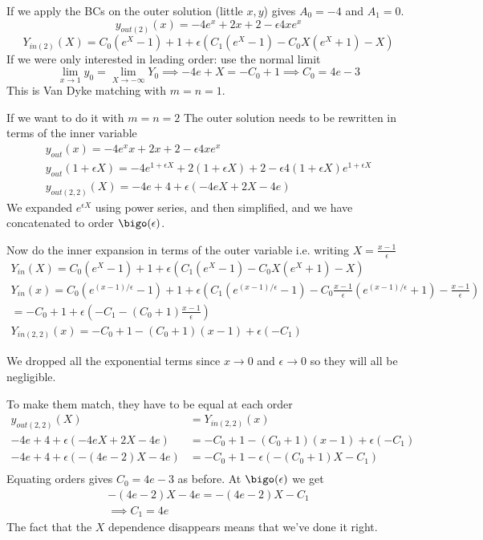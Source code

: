 \documentclass{/home/janmebows/Documents/LatexTemplates/myassignment}
\begin{document}
If we apply the BCs on the outer solution (little $x,y$) gives $A_0 = -4$ and $A_1 =0$. 
\[y_{out(2)}(x) = -4e^x + 2x + 2 - \epsilon 4xe^x\]
\[Y_{in(2)}(X) = C_0(e^X -1) + 1 + \epsilon(C_1(e^X -1) - C_0X(e^X + 1) - X)\]
If we were only interested in leading order: use the normal limit 
\[\lim_{x\to 1} y_0 = \lim_{X\to-\infty} Y_0 \implies -4e +X = -C_0 +1 \implies C_0 = 4e-3\]
This is Van Dyke matching with $m=n=1$.

If we want to do it with $m=n=2$ The outer solution needs to be rewritten in terms of the inner variable
\begin{align*}
    y_{out}(x) =-4e^xx + 2x + 2 -\epsilon 4xe^x \\
    y_{out}(1+\epsilon X) = -4e^{1+\epsilon X} +2 (1+\epsilon X)+2 -\epsilon 4(1+\epsilon X) e^{1+\epsilon X}\\
    y_{out(2,2)}(X) = -4e + 4 + \epsilon(-4eX + 2X - 4e)
\end{align*}
We expanded $e^{\epsilon X}$ using power series, and then simplified, and we have concatenated to order $\bigo(\epsilon)$.


Now do the inner expansion in terms of the outer variable i.e. writing $X = \frac{x-1}{\epsilon}$
\begin{align*}
    Y_{in}(X) = C_0(e^X - 1) + 1 + \epsilon \left(C_1(e^X - 1) - C_0 X(e^X +1) -X\right)\\
    Y_{in}(x) = C_0(e^{(x-1)/\epsilon} -1 )+1 + \epsilon\left(C_1 (e^{(x-1)/\epsilon} -1) - C_0\frac{x-1}{\epsilon}(e^{(x-1)/\epsilon}+1 ) - \frac{x-1}{\epsilon}\right)\\
    = -C_0 + 1 + \epsilon\left(-C_1 - (C_0 +1) \frac{x-1}{\epsilon}\right)\\
    Y_{in(2,2)}(x) = -C_0 + 1 - (C_0 + 1) (x-1) + \epsilon(-C_1)
\end{align*}

We dropped all the exponential terms since $x\to 0$ and $\epsilon\to 0$ so they will all be negligible.

To make them match, they have to be equal at each order
\begin{align*}
    y_{out(2,2)}(X) &= Y_{in(2,2)}(x)\\
    -4e + 4 + \epsilon(-4eX + 2X - 4e) &= -C_0 + 1 - (C_0 + 1) (x-1) + \epsilon(-C_1)\\
    -4e + 4 + \epsilon(-(4e- 2)X - 4e) &= -C_0 + 1 - \epsilon(-(C_0 + 1)X - C_1)\\
\end{align*}
Equating orders gives $C_0 = 4e-3$ as before. At $\bigo(\epsilon)$ we get
\begin{align*}
    -(4e - 2)X - 4e = -(4e - 2)X - C_1\\
    \implies C_1 = 4e
\end{align*}
The fact that the $X$ dependence disappears means that we've done it right.
\end{document}
